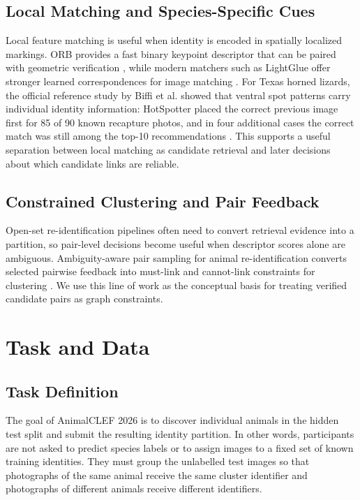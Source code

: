 \documentclass{ceurart}
\begin{document}
\subsection{Local Matching and Species-Specific Cues}
Local feature matching is useful when identity is encoded in spatially localized markings. ORB provides a fast binary keypoint descriptor that can be paired with geometric verification \cite{orb}, while modern matchers such as LightGlue offer stronger learned correspondences for image matching \cite{lightglue}. For Texas horned lizards, the official reference study by Biffi et al. showed that ventral spot patterns carry individual identity information: HotSpotter placed the correct previous image first for 85 of 90 known recapture photos, and in four additional cases the correct match was still among the top-10 recommendations \cite{biffi2025identification}. This supports a useful separation between local matching as candidate retrieval and later decisions about which candidate links are reliable.

\subsection{Constrained Clustering and Pair Feedback}
Open-set re-identification pipelines often need to convert retrieval evidence into a partition, so pair-level decisions become useful when descriptor scores alone are ambiguous. Ambiguity-aware pair sampling for animal re-identification converts selected pairwise feedback into must-link and cannot-link constraints for clustering \cite{sani2026active}. We use this line of work as the conceptual basis for treating verified candidate pairs as graph constraints.

\section{Task and Data}
\subsection{Task Definition}
The goal of AnimalCLEF 2026 is to discover individual animals in the hidden test split and submit the resulting identity partition. In other words, participants are not asked to predict species labels or to assign images to a fixed set of known training identities. They must group the unlabelled test images so that photographs of the same animal receive the same cluster identifier and photographs of different animals receive different identifiers.
\end{document}
